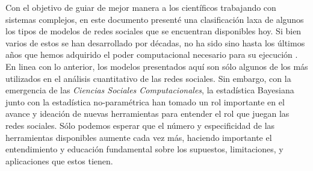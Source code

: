 \documentclass[11pt]{article}
\begin{document}
Con el objetivo de guiar de mejor manera a los científicos trabajando con sistemas complejos, en este documento presenté una clasificación laxa de algunos los tipos de modelos de redes sociales que se encuentran disponibles hoy. Si bien varios de estos se han desarrollado por décadas, no ha sido sino hasta los últimos años que hemos adquirido el poder computacional necesario para su ejecución \parencite{Hofman2021,Lazer2020}. En linea con lo anterior, los modelos presentados aquí son sólo algunos de los más utilizados en el análisis cuantitativo de las redes sociales. Sin embargo, con la emergencia de las \textit{Ciencias Sociales Computacionales}, la estadística Bayesiana junto con la estadística no-paramétrica han tomado un rol importante en el avance y ideación de nuevas herramientas para entender el rol que juegan las redes sociales. Sólo podemos esperar que el número y especificidad de las herramientas disponibles aumente cada vez más, haciendo importante el entendimiento y educación fundamental sobre los supuestos, limitaciones, y aplicaciones que estos tienen. 

%

\printbibliography
\end{document}
